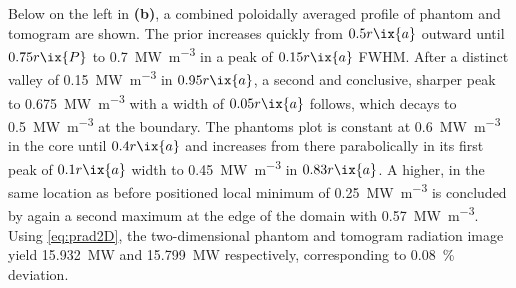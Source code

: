                 Below on the left in \textbf{(b)}, a combined poloidally averaged profile of phantom and tomogram are shown. The prior increases quickly from $0.5r\ix{a}$ outward until $0.75r\ix{P}$ to \SI{0.7}{\mega\watt\per\cubic\meter} in a peak of $0.15r\ix{a}$ FWHM. After a distinct valley of \SI{0.15}{\mega\watt\per\cubic\meter} in $0.95r\ix{a}$, a second and conclusive, sharper peak to \SI{0.675}{\mega\watt\per\cubic\meter} with a width of $0.05r\ix{a}$ follows, which decays to \SI{0.5}{\mega\watt\per\cubic\meter} at the boundary. The phantoms plot is constant at \SI{0.6}{\mega\watt\per\cubic\meter} in the core until $0.4r\ix{a}$ and increases from there parabolically in its first peak of $0.1r\ix{a}$ width to \SI{0.45}{\mega\watt\per\cubic\meter} in $0.83r\ix{a}$. A higher, in the same location as before positioned local minimum of \SI{0.25}{\mega\watt\per\cubic\meter} is concluded by again a second maximum at the edge of the domain with \SI{0.57}{\mega\watt\per\cubic\meter}. Using \cref{eq:prad2D}, the two-dimensional phantom and tomogram radiation image yield \SI{15.932}{\mega\watt} and \SI{15.799}{\mega\watt} respectively, corresponding to \SI{0.08}{\percent} deviation.\\%

